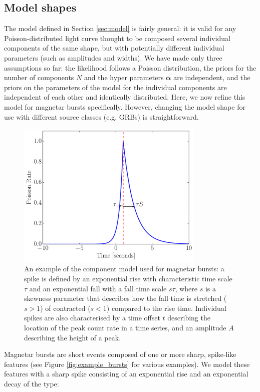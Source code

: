 \documentclass[12pt]{emulateapj}
\begin{document}
\subsection{Model shapes}
\label{sec:wordmodel}

The model defined in Section \ref{sec:model} is fairly general: it is valid for any Poisson-distributed light curve thought to be composed several individual components of
the same shape, but with potentially different individual parameters (such as amplitudes and widths). 
We have made only three assumptions so far: the likelihood follows a Poisson distribution, the priors for the number of components $N$ and the hyper parameters $\bm{\alpha}$ are independent,
and the priors on the parameters of the model for the individual components are independent of each other and identically distributed. 
Here, we now refine this model for magnetar bursts specifically. However, changing the model shape for use with different source classes (e.g. GRBs) is straightforward.
\begin{figure}[h]
\begin{center}
\includegraphics[width=9cm]{word.pdf}
\caption{An example of the component model used for magnetar bursts: a spike is defined by an exponential rise with characteristic
time scale $\tau$ and an exponential fall with a fall time scale $s\tau$, where $s$ is a skewness parameter that describes how the fall
time is stretched ($s > 1$) of contracted ($s < 1$) compared to the rise time. Individual spikes are also characterised by a time offset
$t$ describing the location of the peak count rate in a time series, and an amplitude $A$ describing the height of a peak.}
\label{fig:word_example}
\end{center}
\end{figure}
Magnetar bursts are short events composed of one or more sharp, spike-like features (see Figure \ref{fig:example_bursts} for various examples). We model these features
with a sharp spike consisting of an exponential rise and an exponential decay of the type:
\end{document}
